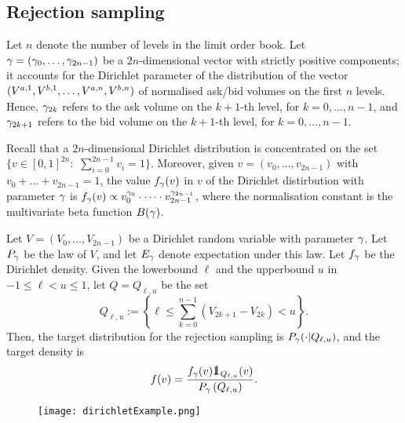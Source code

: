 \documentclass[10pt, article,table]{article}
\begin{document}
\newpage 

\subsection{Rejection sampling}\label{sec.pipest.rejection_sampling}

Let $n$ denote the number of levels in the limit order book. Let $\dirparam=(\dirparam_{0},\dots,\dirparam_{2n-1})$ be a $2n$-dimensional vector with strictly positive components; it accounts for the Dirichlet parameter of the distribution of the vector $(\nthBestAskVolume[1],\nthBestBidVolume[1],\dots, \nthBestAskVolume[n],\nthBestBidVolume[n])$ of normalised ask/bid volumes on the first $n$ levels. Hence, $\dirparam_{2k}$ refers to the ask volume on the $k+1$-th level, for $k=0,\dots,n-1$, and 
$\dirparam_{2k+1}$ refers to the bid volume on the $k+1$-th level, for $k=0,\dots,n-1$. 

Recall that a $2n$-dimensional Dirichlet distribution is concentrated on the set $\lbrace v \in [0,1]^{2n}: \, \, \sum_{i=0}^{2n-1} v_i = 1 \rbrace$. Moreover, given $v=(v_0, \dots,v_{2n-1})$ with  $v_0 + \dots + v_{2n-1} = 1$, the value $\dirichletDensity(v)$ in $v$  of the Dirichlet distirbution with parameter $\dirparam$ is $\dirichletDensity(v) \propto v_{0}^{\dirparam_{0}} \cdot \dots \cdot v_{2n-1}^{\dirparam_{2n-1}}$, where  the normalisation constant is the multivariate beta function $B(\dirparam)$.



Let $V=(V_{0}, \dots,V_{2n-1})$ be a Dirichlet random variable with parameter $\dirparam$. Let $\dirichletLaw$ be the law of $V$, and let $\Expectation_{\dirparam}$ denote expectation under this law. Let $\dirichletDensity$ be the Dirichlet density.  Given the lowerbound $\ell$ and the upperbound $u$ in $-1\leq \ell < u \leq 1$, let $Q=Q_{\ell, u}$ be the set 
\begin{equation}\label{eq.volimb_constraint}
 Q_{\ell,u}:= \left\lbrace
 \ell \leq \sum_{k=0}^{n-1} \left( V_{2k+1} - V_{2k} \right)
 < u
 \right\rbrace. 
\end{equation}
Then, the target distribution for the rejection sampling is $\dirichletLaw(\cdot \vert Q_{\ell,u})$, and the target density is 
\begin{equation}\label{eq.target_density}
 \targetDensity(v) = 
 \frac{\dirichletDensity(v)\one _{Q_{\ell,u}} (v)}{\dirichletLaw\left(Q_{\ell,u}\right)}. 
\end{equation}


\begin{figure}\label{fig.dirichletAccept}
 \centering
 \texttt{[image: dirichletExample.png]}
\end{figure}
\end{document}
